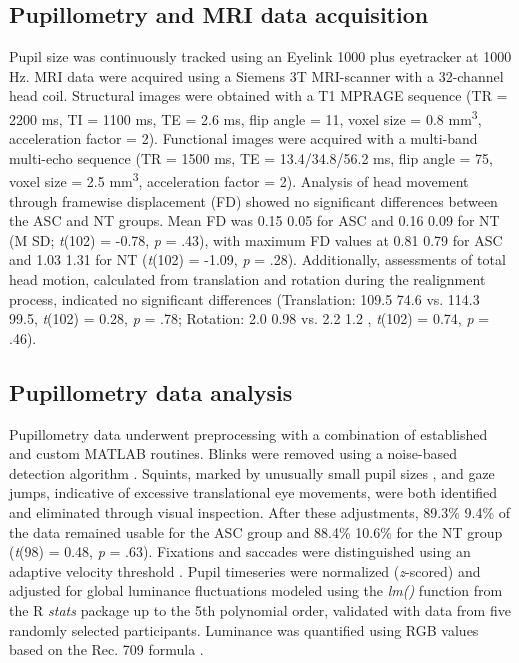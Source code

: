 \subsection*{Pupillometry and MRI data acquisition}
Pupil size was continuously tracked using an Eyelink 1000 plus eyetracker at 1000 Hz. MRI data were acquired using a Siemens 3T MRI-scanner with a 32-channel head coil. Structural images were obtained with a T1 MPRAGE sequence (TR = 2200 ms, TI = 1100 ms, TE = 2.6 ms, flip angle = 11\textdegree, 
voxel size = 0.8 mm\textsuperscript{3}, acceleration factor = 2). Functional images were acquired with a multi-band multi-echo sequence (TR = 1500 ms, TE = 13.4/34.8/56.2 ms, flip angle = 75\textdegree, voxel size = 2.5 mm\textsuperscript{3}, acceleration factor = 2). Analysis of head movement through framewise displacement (FD) showed no significant differences between the ASC and NT groups. Mean FD was 0.15 \textpm{}{} 0.05 for ASC and 0.16 \textpm{}{} 0.09 for NT (M \textpm{} SD; \textit{t}(102) = -0.78, \textit{p} = .43), with maximum FD values at 0.81 \textpm{} 0.79 for ASC and 1.03 \textpm{} 1.31 for NT (\textit{t}(102) = -1.09, \textit{p} = .28). Additionally, assessments of total head motion, calculated from translation and rotation during the realignment process, indicated no significant differences (Translation: 109.5 \textpm{} 74.6 vs. 114.3 \textpm{} 99.5, \textit{t}(102) = 0.28, \textit{p} = .78; Rotation: 2.0 \textpm{} 0.98 vs. 2.2 \textpm{} 1.2 , \textit{t}(102) = 0.74, \textit{p} = .46).

\subsection*{Pupillometry data analysis}
Pupillometry data underwent preprocessing with a combination of established and custom MATLAB routines. Blinks were removed using a noise-based detection algorithm \citep{hershman2018}. Squints, marked by unusually small pupil sizes \citep{mathot2018}, and gaze jumps, indicative of excessive translational eye movements, were both identified and eliminated through visual inspection. After these adjustments, 89.3\% \textpm{} 9.4\% of the data remained usable for the ASC group and 88.4\% \textpm{} 10.6\% for the NT group (\textit{t}(98) = 0.48, \textit{p} = .63). Fixations and saccades were distinguished using an adaptive velocity threshold \citep{nystrom2010}. Pupil timeseries were normalized (\textit{z}-scored) and adjusted for global luminance fluctuations modeled using the \textit{lm()} function from the R \textit{stats} package \citep{bates2015} up to the 5th polynomial order, validated with data from five randomly selected participants. Luminance was quantified using RGB values based on the Rec. 709 formula \citep{itu2002}. 

